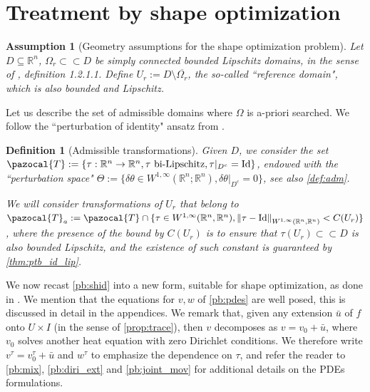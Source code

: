 \documentclass[english,a4paper,9pt,oneside]{scrbook}	%
\theoremstyle{break}
\newtheorem{defn}[equation]{Definition}
\newtheorem{ass}[equation]{Assumption}
\theoremstyle{remark}
\newcommand{\mR}{\mathbb{R}}
\newcommand{\norm}[1]{\left\lVert#1\right\rVert}
\newcommand{\cc}{\subset\subset}
\newcommand{\cT}{\pazocal{T}}
\newcommand{\id}{\text{Id}}
\newcommand{\te}{\theta}
\newcommand{\Te}{\Theta}
\begin{document}
\section{Treatment by shape optimization}
\label{sec:shopt_treatment}

\begin{ass}[Geometry assumptions for the shape optimization problem]
\label{ass:geo_sh}
Let $D\subseteq \mR^n$, $\Omega_r \cc D$ be simply connected bounded Lipschitz domains, in the sense of \cite{grisvard}, definition 1.2.1.1. Define $U_r:=D\setminus \overline{\Omega_r}$, the so-called ``reference domain", which is also bounded and Lipschitz.
\end{ass}

Let us describe the set of admissible domains where $\Omega$ is a-priori searched. We follow the ``perturbation of identity" ansatz from \cite{murat}.

\begin{defn}[Admissible transformations]
\label{def:adm_transf}
Given $D$, we consider the set $\cT:=\{\tau:\mR^n\rightarrow\mR^n, \tau \text{ bi-Lipschitz}, \tau|_{D^c} = \id\}$, endowed with the ``perturbation space" $\Te:=\{ \delta \te \in W^{1,\infty}(\mR^n;\mR^n), \delta \te|_{D^c}=0\}$, see also \cref{def:adm}.

We will consider transformations of $U_r$ that belong to $\cT_a:=\cT \cap \{ \tau \in W^{1,\infty}(\mR^n, \mR^n), \norm{\tau - \id}_{W^{1,\infty}(\mR^n, \mR^n)}<C(U_r)\}$, where the presence of the bound by $C(U_r)$ is to ensure that $\tau(U_r)\cc D$ is also bounded Lipschitz, and the existence of such constant is guaranteed by \cref{thm:ptb_id_lip}.

\end{defn}


We now recast \cref{pb:shid} into a new form, suitable for shape optimization, as done in \cite{harbrecht}. We mention that the equations for $v,w$ of \cref{pb:pdes} are well posed, this is discussed in detail in the appendices. We remark that, given any extension $\bar{u}$ of $f$ onto $U\times I$ (in the sense of \cref{prop:trace}), then $v$ decomposes as $v = v_0+\bar{u}$, where $v_0$ solves another heat equation with zero Dirichlet conditions. We therefore write $v^\tau = v_0^\tau + \bar{u}$ and $w^\tau$ to emphasize the dependence on $\tau$, and refer the reader to \cref{pb:mix}, \cref{pb:diri_ext} and \cref{pb:joint_mov} for additional details on the PDEs formulations.
\end{document}
